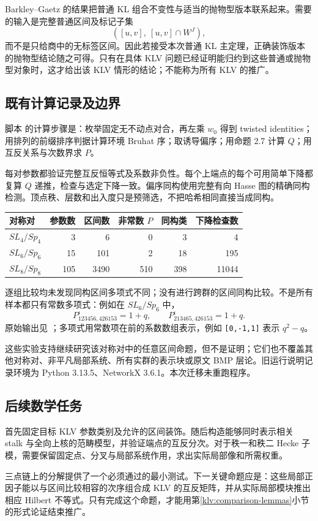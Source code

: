 Barkley--Gaetz\cite{BG} 的结果把普通 KL 组合不变性与适当的抛物型版本联系起来。需要的输入是完整普通区间及标记子集
\[
([u,v],\ [u,v]\cap W^J),
\]
而不是只给商中的无标签区间。因此若接受本次普通 KL 主定理，正确装饰版本的抛物型结论随之可得。只有在具体 KLV 问题已经证明能归约到这些普通或抛物型对象时，这才给出该 KLV 情形的结论；不能称为所有 KLV 的推广。

\subsection{既有计算记录及边界}\label{klv:computations}
脚本  的计算步骤是：枚举固定无不动点对合，再左乘 \(w_0\) 得到 twisted identities；用排列的前缀排序判据计算环境 Bruhat 序；取诱导偏序；用\cite{AH}命题 2.7 计算 \(Q\)；用互反关系与次数界求 \(P\)。

每对参数都验证完整互反恒等式及系数非负性。每个上端点的每个可用简单下降都复算 \(Q\) 递推，检查与选定下降一致。偏序同构使用完整有向 Hasse 图的精确同构检测。顶点秩、层数和出入度只是预筛选，不把哈希相同直接当成同构。

\begin{center}\small
\begin{tabular}{@{}lrrrrr@{}}
\toprule
对称对 & 参数数 & 区间数 & 非常数 \(P\) & 同构类 & 下降检查数 \\
\midrule
\(SL_4/Sp_4\) & 3 & 6 & 0 & 3 & 4 \\
\(SL_6/Sp_6\) & 15 & 101 & 2 & 18 & 195 \\
\(SL_8/Sp_8\) & 105 & 3490 & 510 & 398 & 11044 \\
\bottomrule
\end{tabular}
\end{center}

逐组比较均未发现同构区间多项式不同；没有进行跨群的区间同构比较。不是所有样本都只有常数多项式：例如在 \(SL_6/Sp_6\) 中，
\[
P^\iota_{123456,426153}=1+q,\qquad
P^\iota_{213465,426153}=1+q.
\]
原始输出见 ；多项式用常数项在前的系数数组表示，例如 \texttt{[0,-1,1]} 表示 \(q^2-q\)。

这些实验支持继续研究该对称对中的任意区间命题，但不是证明；它们也不覆盖其他对称对、非平凡局部系统、所有实群的表示块或原文 BMP 层论。旧运行说明记录环境为 Python 3.13.5、NetworkX 3.6.1。本次迁移未重跑程序。

\subsection{后续数学任务}
首先固定目标 KLV 参数类别及允许的区间装饰。随后构造能够同时表示相关 stalk 与全向上核的范畴模型，并验证端点的互反分次。对于秩一和秩二 Hecke 子模，需要保留固定点、分叉与局部系统作用，求出实际局部像和所需权重。

三点链上的分解提供了一个必须通过的最小测试。下一关键命题应是：这些局部正因子能以与区间比较相容的次序组合成 KLV 的互反矩阵，并从实际局部模块推出相应 Hilbert 不等式。只有完成这个命题，才能用第\ref{klv:comparison-lemmas}小节的形式论证结束推广。
